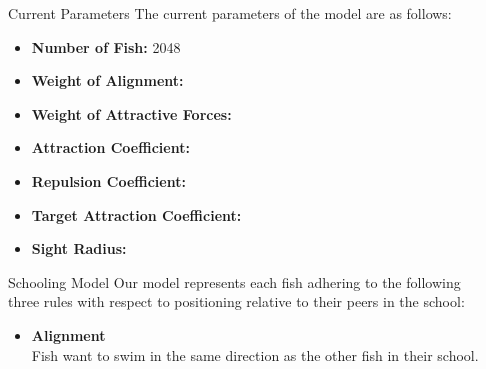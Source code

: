 \documentclass[final, xcolor=dvipsnames]{beamer}
\newlength{\sepwid}
\newlength{\onecolwid}
\begin{document}
\begin{frame}[t] %

\begin{columns}[t] %

\begin{column}{\sepwid}\end{column} %

\begin{column}{\onecolwid} %


\begin{alertblock}{Current Parameters}
The current parameters of the model are as follows:
\begin{itemize}
\item \textbf{Number of Fish:} \hfill 2048 
\item \textbf{Weight of Alignment:} \hfill 
\item \textbf{Weight of Attractive Forces:}
\item \textbf{Attraction Coefficient:}
\item \textbf{Repulsion Coefficient:}
\item \textbf{Target Attraction Coefficient:}
\item \textbf{Sight Radius:}
\end{itemize}

\end{alertblock}


\begin{block}{Schooling Model}
	Our model represents each fish adhering to the following three rules with respect to positioning relative to their peers in the school:
	\begin{itemize}
		\item \textcolor{OliveGreen}{\textbf{Alignment}} \\
			Fish want to swim in the same direction as the other fish in their school.\\
			\begin{figure}
				\centering
\end{figure}
\end{itemize}
\end{block}
\end{column}
\end{columns}
\end{frame}
\end{document}
